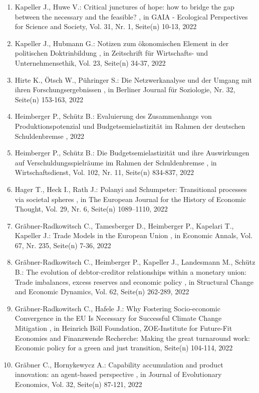 \begin{enumerate}[leftmargin=*, labelsep=0.5cm]
	 \item Kapeller J., Huwe V.:  Critical junctures of hope: how to bridge the gap between the necessary and the feasible?  , in GAIA - Ecological Perspectives for Science and Society, Vol. 31, Nr. 1, Seite(n) 10-13, 2022
	 \item Kapeller J., Hubmann G.:  Notizen zum ökonomischen Element in der politischen Doktrinbildung  , in Zeitschrift für Wirtschafts- und Unternehmensethik, Vol. 23, Seite(n) 34-37, 2022
	 \item Hirte K., Ötsch W., Pühringer S.:  Die Netzwerkanalyse und der Umgang mit ihren Forschungsergebnissen  , in Berliner Journal für Soziologie, Nr. 32, Seite(n) 153-163, 2022
	 \item Heimberger P., Schütz B.:  Evaluierung des Zusammenhangs von Produktionspotenzial und Budgetsemielastizität im Rahmen der deutschen Schuldenbremse  , 2022
	 \item Heimberger P., Schütz B.:  Die Budgetsemielastizität und ihre Auswirkungen auf Verschuldungsspielräume im Rahmen der Schuldenbremse  , in Wirtschaftsdienst, Vol. 102, Nr. 11, Seite(n) 834-837, 2022
	 \item Hager T., Heck I., Rath J.:  Polanyi and Schumpeter: Transitional processes via societal spheres  , in The European Journal for the History of Economic Thought, Vol. 29, Nr. 6, Seite(n) 1089–1110, 2022
	 \item Gräbner-Radkowitsch C., Tamesberger D., Heimberger P., Kapelari T., Kapeller J.:  Trade Models in the European Union  , in Economic Annals, Vol. 67, Nr. 235, Seite(n) 7-36, 2022
	 \item Gräbner-Radkowitsch C., Heimberger P., Kapeller J., Landesmann M., Schütz B.:  The evolution of debtor-creditor relationships within a monetary union: Trade imbalances, excess reserves and economic policy  , in Structural Change and Economic Dynamics, Vol. 62, Seite(n) 262-289, 2022
	 \item Gräbner-Radkowitsch C., Hafele J.:  Why Fostering Socio-economic Convergence in the EU Is Necessary for Successful Climate Change Mitigation  , in Heinrich Böll Foundation, ZOE-Institute for Future-Fit Economies and Finanzwende Recherche: Making the great turnaround work: Economic policy for a green and just transition, Seite(n) 104-114, 2022
	 \item Gräbner C., Hornykewycz A.:  Capability accumulation and product innovation: an agent-based perspective  , in Journal of Evolutionary Economics, Vol. 32, Seite(n) 87-121, 2022
\end{enumerate} 
